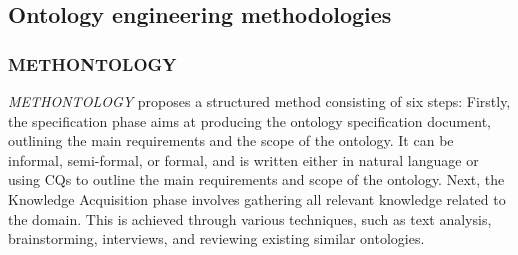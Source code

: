 \subsection{Ontology engineering methodologies}
\subsubsection{METHONTOLOGY}
\textit{METHONTOLOGY} \cite{fernandez1997ontological} proposes a structured method consisting of six steps:  
Firstly, the \textsf{specification} phase aims at producing the ontology specification document, outlining the main requirements and the scope of the ontology.
It can be informal, semi-formal, or formal, and is written either in natural language or using CQs to outline the main requirements and scope of the ontology. 
Next, the Knowledge Acquisition phase involves gathering all relevant knowledge related to the domain. 
This is achieved through various techniques, such as text analysis, brainstorming, interviews, and reviewing existing similar ontologies.

